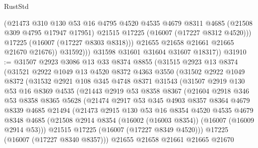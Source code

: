 \begin{lexlean}{RustStd}
\begin{coremodule}
                    (@21473
                      @310
                      @130
                      @53
                      @16
                      @4795
                      @4520
                      @4535
                      @4679
                      @8311
                      @4685
                      (@21508 @309 @4795 @17947 @17951)
                      @21515
                      @17225
                      (@16007 (@17227 @8312 @4520)))
                    @17225
                    (@16007 (@17227 @8303 @8318)))
                  @21655
                  @21658
                  @21661
                  @21665
                  @21670
                  @21676))
              @31592)))
        @31598
        @31601
        @31604
        @31607
        @18317))
@31910 := @31507
    @2923
    @3086
    @13
    @33
    @8374
    @8855
    (@31515
      @2923
      @13
      @8374
      (@31521
        @2922
        @1049
        @13
        @4520
        @8372
        @4363
        @3550
        (@31502
          @2922
          @1049
          @8372
          (@31532
            @2921
            @108
            @345
            @4748
            @8371
            @31543
            (@31507
              @2919
              @130
              @53
              @16
              @8369
              @4535
              (@21443
                @2919
                @53
                @8358
                @8367
                (@21604
                  @2918
                  @346
                  @53
                  @8358
                  @8365
                  @5628
                  (@21474
                    @2917
                    @53
                    @345
                    @4903
                    @8357
                    @8364
                    @4679
                    @8339
                    @4685
                    @21494
                    (@21473
                      @2915
                      @130
                      @53
                      @16
                      @8354
                      @4520
                      @4535
                      @4679
                      @8348
                      @4685
                      (@21508 @2914 @8354 (@16002 (@16003 @8354)) (@16007 (@16009 @2914 @53)))
                      @21515
                      @17225
                      (@16007 (@17227 @8349 @4520)))
                    @17225
                    (@16007 (@17227 @8340 @8357)))
                  @21655
                  @21658
                  @21661
                  @21665
                  @21670

\end{coremodule}
\end{lexlean}
